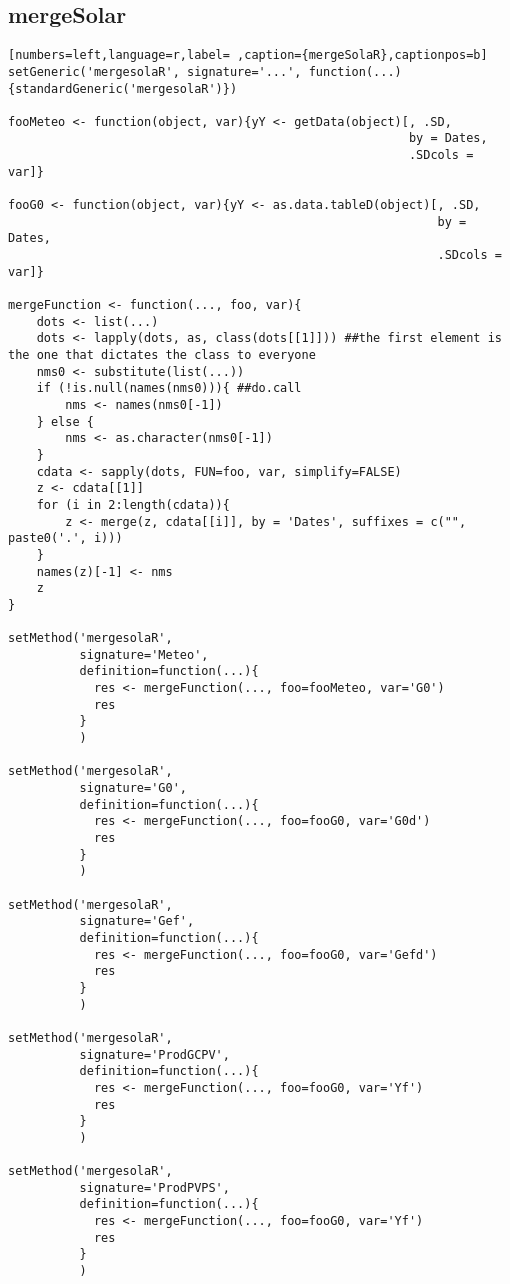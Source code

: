 \subsection{mergeSolar}
\label{sec:org9e040be}
\label{subsec:mergesolar}
\begin{lstlisting}[numbers=left,language=r,label= ,caption={mergeSolaR},captionpos=b]
setGeneric('mergesolaR', signature='...', function(...){standardGeneric('mergesolaR')})

fooMeteo <- function(object, var){yY <- getData(object)[, .SD,
                                                        by = Dates,
                                                        .SDcols = var]}

fooG0 <- function(object, var){yY <- as.data.tableD(object)[, .SD,
                                                            by = Dates,
                                                            .SDcols = var]}

mergeFunction <- function(..., foo, var){
    dots <- list(...)
    dots <- lapply(dots, as, class(dots[[1]])) ##the first element is the one that dictates the class to everyone
    nms0 <- substitute(list(...))
    if (!is.null(names(nms0))){ ##do.call
        nms <- names(nms0[-1])
    } else { 
        nms <- as.character(nms0[-1])
    }
    cdata <- sapply(dots, FUN=foo, var, simplify=FALSE)
    z <- cdata[[1]]
    for (i in 2:length(cdata)){
        z <- merge(z, cdata[[i]], by = 'Dates', suffixes = c("", paste0('.', i)))
    }
    names(z)[-1] <- nms
    z
}

setMethod('mergesolaR',
          signature='Meteo',
          definition=function(...){
            res <- mergeFunction(..., foo=fooMeteo, var='G0')
            res
          }
          )

setMethod('mergesolaR',
          signature='G0',
          definition=function(...){
            res <- mergeFunction(..., foo=fooG0, var='G0d')
            res
          }
          )

setMethod('mergesolaR',
          signature='Gef',
          definition=function(...){
            res <- mergeFunction(..., foo=fooG0, var='Gefd')
            res
          }
          )

setMethod('mergesolaR',
          signature='ProdGCPV',
          definition=function(...){
            res <- mergeFunction(..., foo=fooG0, var='Yf')
            res
          }
          )

setMethod('mergesolaR',
          signature='ProdPVPS',
          definition=function(...){
            res <- mergeFunction(..., foo=fooG0, var='Yf')
            res
          }
          )
\end{lstlisting}

